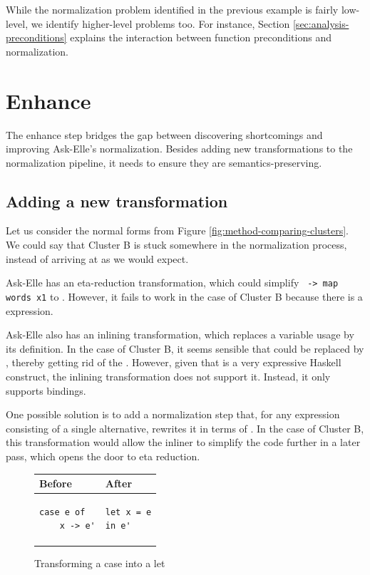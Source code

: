 While the normalization problem identified in the previous example is fairly low-level, we identify higher-level problems too. For instance, Section \ref{sec:analysis-preconditions} explains the interaction between function preconditions and normalization.

\section{Enhance}
\label{sec:method-enhance}

The enhance step bridges the gap between discovering shortcomings and improving Ask-Elle's normalization. Besides adding new transformations to the normalization pipeline, it needs to ensure they are semantics-preserving.

\subsection{Adding a new transformation}

Let us consider the normal forms from Figure \ref{fig:method-comparing-clusters}. We could say that Cluster B is stuck somewhere in the normalization process, instead of arriving at  as we would expect.

Ask-Elle has an eta-reduction transformation, which could simplify \texttt{ -> map words x1} to . However, it fails to work in the case of Cluster B because there is a  expression.

Ask-Elle also has an inlining transformation, which replaces a variable usage by its definition. In the case of Cluster B, it seems sensible that  could be replaced by , thereby getting rid of the . However, given that  is a very expressive Haskell construct, the inlining transformation does not support it. Instead, it only supports  bindings.

One possible solution is to add a normalization step that, for any  expression consisting of a single alternative, rewrites it in terms of . In the case of Cluster B, this transformation would allow the inliner to simplify the code further in a later pass, which opens the door to eta reduction.

\begin{figure}[H]
\centering
\begin{tabular}{ m{8em} | m{8em} }
    Before & After \\
    \hline
    \begin{verbatim}
case e of
    x -> e'
    \end{verbatim}
    &
    \begin{verbatim}
let x = e
in e'
    \end{verbatim}
\end{tabular}
\caption{Transforming a case into a let}
\label{fig:method-case-to-let}
\end{figure}

